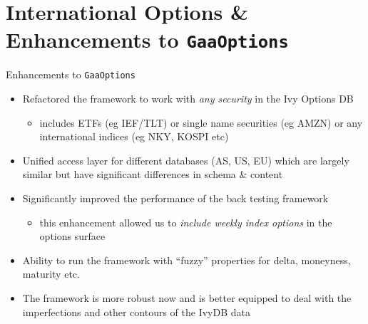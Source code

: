 \documentclass{beamer}
\begin{document}
\section{International Options \& Enhancements to {\tt GaaOptions}}
\begin{frame}{Enhancements to {\tt GaaOptions}}
\begin{itemize}
\item Refactored the framework to work with {\em any security} in the Ivy Options DB
\begin{itemize} \item includes ETFs (eg IEF/TLT) or single name securities (eg AMZN) or any international indices (eg NKY, KOSPI etc) \end{itemize}
\item Unified access layer for different databases (AS, US, EU) which are largely similar but have significant differences in schema \& content
\item Significantly improved the performance of the back testing framework
\begin{itemize} \item this enhancement allowed us to {\em include weekly index options} in the options surface \end{itemize}
\item Ability to run the framework with ``fuzzy'' properties for delta, moneyness, maturity etc. 
\item The framework is more robust now and is better equipped to deal with the imperfections and other contours of the IvyDB data
\end{itemize}
\end{frame}
\end{document}

